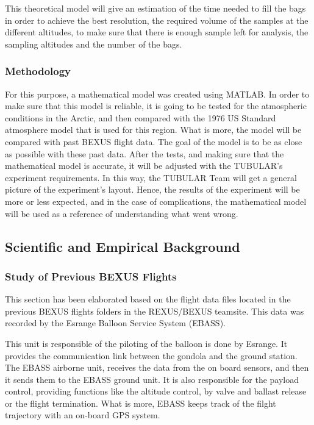 \documentclass[a4paper,12pt,oneside]{article}
\begin{document}
\begin{appendices}
This theoretical model will give an estimation of the time needed to fill the bags in order to achieve the best resolution, the required volume of the samples at the different altitudes, to make sure that there is enough sample left for analysis, the sampling altitudes and the number of the bags.  

\subsubsection{Methodology}

For this purpose, a mathematical model was created using MATLAB. In order to make sure that this model is reliable, it is going to be tested for the atmospheric conditions in the Arctic, and then compared with the 1976 US Standard atmosphere model that is used for this region. What is more, the model will be compared with past BEXUS flight data. The goal of the model is to be as close as possible with these past data. 
After the tests, and making sure that the mathematical model is accurate, it will be adjusted with the TUBULAR's experiment requirements. In this way, the TUBULAR Team will get a general picture of the experiment's layout. Hence, the results of the experiment will be more or less expected, and in the case of complications, the mathematical model will be used as a reference of understanding what went wrong.


\subsection{Scientific and Empirical Background}

\subsubsection{Study of Previous BEXUS Flights}
This section has been elaborated based on the flight data files located in the previous BEXUS flights folders in the REXUS/BEXUS teamsite. This data was recorded by the Esrange Balloon Service System (EBASS).

\smallskip
This unit is responsible of the piloting of the balloon is done by Esrange. It provides the communication link between the gondola and the ground station. The EBASS airborne unit, receives the data from the on board sensors, and then it sends them to the EBASS ground unit. It is also responsible for the payload control, providing functions like the altitude control, by valve and ballast release or the flight termination. What is more, EBASS keeps track of the filght trajectory with an on-board GPS system.


\end{appendices}
\end{document}

